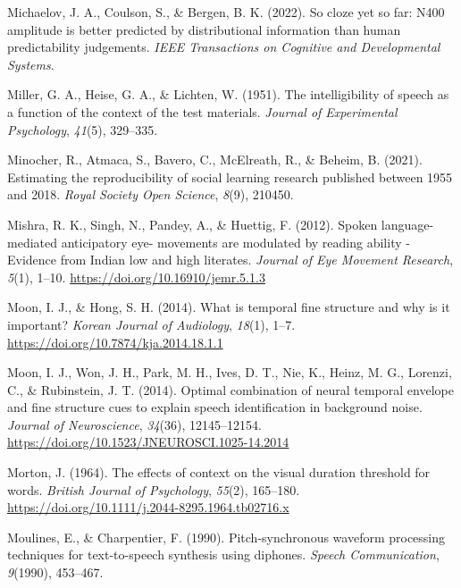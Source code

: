 \documentclass[a4paper, nobind]{templates/ociamthesis}
\newlength{\cslhangindent}
\newenvironment{CSLReferences}[2] %
 {%
  \setlength{\parindent}{0pt}
  \ifodd #1
  \let\oldpar\par
  \def\par{\hangindent=\cslhangindent\oldpar}
  \fi
  \setlength{\parskip}{1mm}
  \setlength{\baselineskip}{6mm}
 }%
 {}
\begin{document}
\begin{CSLReferences}{1}{0}
\leavevmode{}%
Michaelov, J. A., Coulson, S., \& Bergen, B. K. (2022). So cloze yet so far: N400 amplitude is better predicted by distributional information than human predictability judgements. \emph{IEEE Transactions on Cognitive and Developmental Systems}.

\leavevmode{}%
Miller, G. A., Heise, G. A., \& Lichten, W. (1951). {The intelligibility of speech as a function of the context of the test materials}. \emph{Journal of Experimental Psychology}, \emph{41}(5), 329--335.

\leavevmode{}%
Minocher, R., Atmaca, S., Bavero, C., McElreath, R., \& Beheim, B. (2021). Estimating the reproducibility of social learning research published between 1955 and 2018. \emph{Royal Society Open Science}, \emph{8}(9), 210450.

\leavevmode{}%
Mishra, R. K., Singh, N., Pandey, A., \& Huettig, F. (2012). {Spoken language-mediated anticipatory eye- movements are modulated by reading ability - Evidence from Indian low and high literates}. \emph{Journal of Eye Movement Research}, \emph{5}(1), 1--10. \url{https://doi.org/10.16910/jemr.5.1.3}

\leavevmode{}%
Moon, I. J., \& Hong, S. H. (2014). What is temporal fine structure and why is it important? \emph{Korean Journal of Audiology}, \emph{18}(1), 1--7. \url{https://doi.org/10.7874/kja.2014.18.1.1}

\leavevmode{}%
Moon, I. J., Won, J. H., Park, M. H., Ives, D. T., Nie, K., Heinz, M. G., Lorenzi, C., \& Rubinstein, J. T. (2014). Optimal combination of neural temporal envelope and fine structure cues to explain speech identification in background noise. \emph{Journal of Neuroscience}, \emph{34}(36), 12145--12154. \url{https://doi.org/10.1523/JNEUROSCI.1025-14.2014}

\leavevmode{}%
Morton, J. (1964). {The effects of context on the visual duration threshold for words}. \emph{British Journal of Psychology}, \emph{55}(2), 165--180. \url{https://doi.org/10.1111/j.2044-8295.1964.tb02716.x}

\leavevmode{}%
Moulines, E., \& Charpentier, F. (1990). {Pitch-synchronous waveform processing techniques for text-to-speech synthesis using diphones}. \emph{Speech Communication}, \emph{9}(1990), 453--467.


\end{CSLReferences}
\end{document}
